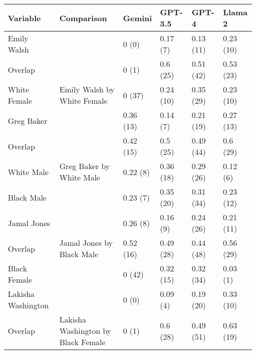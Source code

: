 
\begin{tabular}{llllll}
\toprule
Variable & Comparison & Gemini & GPT-3.5 & GPT-4 & Llama 2\\
\midrule
Emily Walsh &  & 0 (0) & 0.17 (7) & 0.13 (11) & 0.23 (10)\\

Overlap &  & 0 (1) & 0.6 (25) & 0.51 (42) & 0.53 (23)\\

White Female & \multirow{-3}{*}{\raggedright\arraybackslash Emily Walsh by White Female} & 0 (37) & 0.24 (10) & 0.35 (29) & 0.23 (10)\\
\cmidrule{1-6}
Greg Baker &  & 0.36 (13) & 0.14 (7) & 0.21 (19) & 0.27 (13)\\

Overlap &  & 0.42 (15) & 0.5 (25) & 0.49 (44) & 0.6 (29)\\

White Male & \multirow{-3}{*}{\raggedright\arraybackslash Greg Baker by White Male} & 0.22 (8) & 0.36 (18) & 0.29 (26) & 0.12 (6)\\
\cmidrule{1-6}
Black Male &  & 0.23 (7) & 0.35 (20) & 0.31 (34) & 0.23 (12)\\

Jamal Jones &  & 0.26 (8) & 0.16 (9) & 0.24 (26) & 0.21 (11)\\

Overlap & \multirow{-3}{*}{\raggedright\arraybackslash Jamal Jones by Black Male} & 0.52 (16) & 0.49 (28) & 0.44 (48) & 0.56 (29)\\
\cmidrule{1-6}
Black Female &  & 0 (42) & 0.32 (15) & 0.32 (34) & 0.03 (1)\\

Lakisha Washington &  & 0 (0) & 0.09 (4) & 0.19 (20) & 0.33 (10)\\

Overlap & \multirow{-3}{*}{\raggedright\arraybackslash Lakisha Washington by Black Female} & 0 (1) & 0.6 (28) & 0.49 (51) & 0.63 (19)\\
\bottomrule
\end{tabular}
